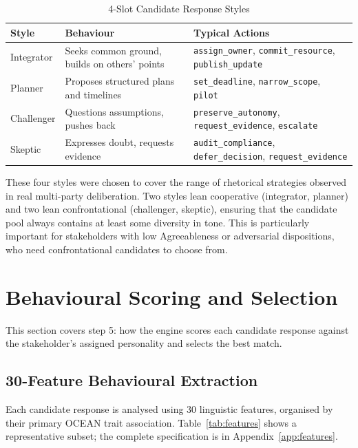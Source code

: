 \documentclass[12pt, a4paper]{report}
\begin{document}
\begin{table}[t]
\centering
\caption{4-Slot Candidate Response Styles}
\label{tab:slots}
\begin{tabular}{p{2cm}p{4cm}p{4cm}}
\toprule
Style & Behaviour & Typical Actions \\
\midrule
Integrator & Seeks common ground, builds on others' points & \texttt{assign\_owner}, \texttt{commit\_resource}, \texttt{publish\_update} \\
Planner & Proposes structured plans and timelines & \texttt{set\_deadline}, \texttt{narrow\_scope}, \texttt{pilot} \\
Challenger & Questions assumptions, pushes back & \texttt{preserve\_autonomy}, \texttt{request\_evidence}, \texttt{escalate} \\
Skeptic & Expresses doubt, requests evidence & \texttt{audit\_compliance}, \texttt{defer\_decision}, \texttt{request\_evidence} \\
\bottomrule
\end{tabular}
\end{table}

These four styles were chosen to cover the range of rhetorical strategies observed in real multi-party deliberation. Two styles lean cooperative (integrator, planner) and two lean confrontational (challenger, skeptic), ensuring that the candidate pool always contains at least some diversity in tone. This is particularly important for stakeholders with low Agreeableness or adversarial dispositions, who need confrontational candidates to choose from.


\section{Behavioural Scoring and Selection}

This section covers step 5: how the engine scores each candidate response against the stakeholder's assigned personality and selects the best match.

\subsection{30-Feature Behavioural Extraction}

Each candidate response is analysed using 30 linguistic features, organised by their primary OCEAN trait association. Table~\ref{tab:features} shows a representative subset; the complete specification is in Appendix~\ref{app:features}.
\end{document}
